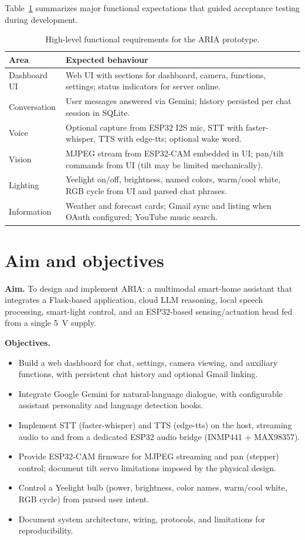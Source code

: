\documentclass[12pt,a4paper]{report}
\begin{document}
Table~\ref{tab:requirements} summarizes major functional expectations that guided acceptance testing during development.

\begin{table}[htbp]
\centering
\caption{High-level functional requirements for the ARIA prototype.}
\label{tab:requirements}
\small
\begin{tabular}{@{}p{}p{}@{}}
\toprule
\textbf{Area} & \textbf{Expected behaviour} \\
\midrule
Dashboard UI & Web UI with sections for dashboard, camera, functions, settings; status indicators for server online. \\
Conversation & User messages answered via Gemini; history persisted per chat session in SQLite. \\
Voice & Optional capture from ESP32 I2S mic, STT with faster-whisper, TTS with edge-tts; optional wake word. \\
Vision & MJPEG stream from ESP32-CAM embedded in UI; pan/tilt commands from UI (tilt may be limited mechanically). \\
Lighting & Yeelight on/off, brightness, named colors, warm/cool white, RGB cycle from UI and parsed chat phrases. \\
Information & Weather and forecast cards; Gmail sync and listing when OAuth configured; YouTube music search. \\
\bottomrule
\end{tabular}
\end{table}

\section{Aim and objectives}

\textbf{Aim.} To design and implement ARIA: a multimodal smart-home assistant that integrates a Flask-based application, cloud LLM reasoning, local speech processing, smart-light control, and an ESP32-based sensing/actuation head fed from a single 5~V supply.

\textbf{Objectives.}
\begin{itemize}
    \item Build a web dashboard for chat, settings, camera viewing, and auxiliary functions, with persistent chat history and optional Gmail linking.
    \item Integrate Google Gemini for natural-language dialogue, with configurable assistant personality and language detection hooks.
    \item Implement STT (faster-whisper) and TTS (edge-tts) on the host, streaming audio to and from a dedicated ESP32 audio bridge (INMP441 + MAX98357).
    \item Provide ESP32-CAM firmware for MJPEG streaming and pan (stepper) control; document tilt servo limitations imposed by the physical design.
    \item Control a Yeelight bulb (power, brightness, color names, warm/cool white, RGB cycle) from parsed user intent.
    \item Document system architecture, wiring, protocols, and limitations for reproducibility.
\end{itemize}
\end{document}
